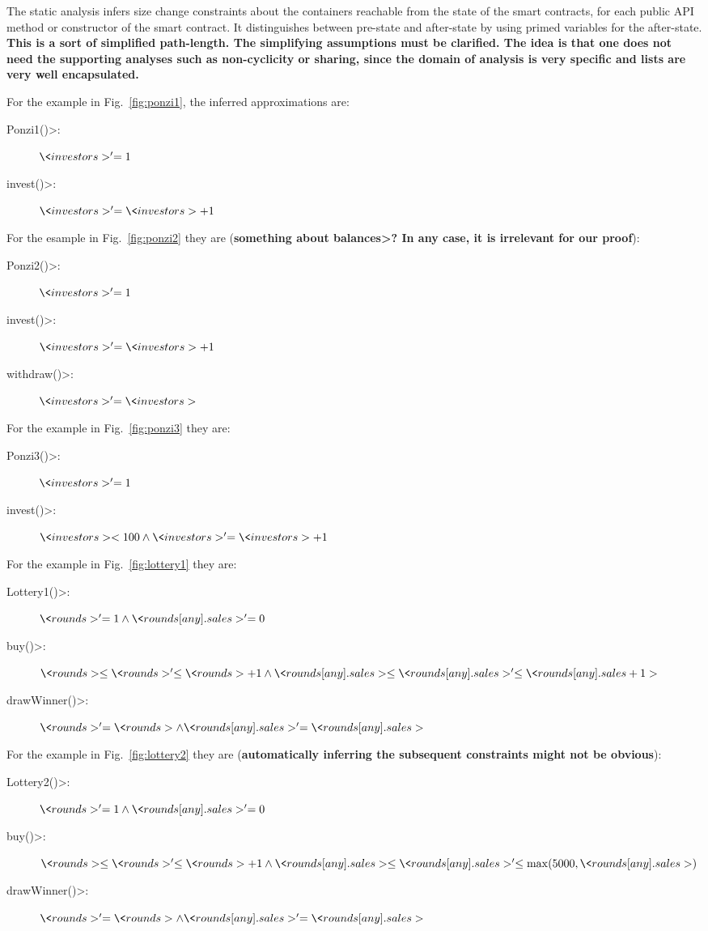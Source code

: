 The static analysis infers size change constraints about the containers
reachable from the state of the smart contracts, for each public API
method or constructor of the smart contract. It distinguishes between
pre-state and after-state by using primed variables for the after-state.
\textbf{This is a sort of simplified path-length. The simplifying
  assumptions must be clarified. The idea is that one does not need
  the supporting analyses such as non-cyclicity or sharing, since the
  domain of analysis is very specific and lists are very well encapsulated.}

For the example in Fig.~\ref{fig:ponzi1}, the inferred approximations are:
%
\begin{description}
\item[\<Ponzi1()>:] $\<investors>'=1$
\item[\<invest()>:] $\<investors>'=\<investors>+1$
\end{description}
%
For the esample in Fig.~\ref{fig:ponzi2} they are (\textbf{something about \<balances>? In any case, it is irrelevant for our proof}):
%
\begin{description}
\item[\<Ponzi2()>:] $\<investors>'=1$
\item[\<invest()>:] $\<investors>'=\<investors>+1$
\item[\<withdraw()>:] $\<investors>'=\<investors>$
\end{description}
%
For the example in Fig.~\ref{fig:ponzi3} they are:
%
\begin{description}
\item[\<Ponzi3()>:] $\<investors>'=1$
\item[\<invest()>:] $\<investors><100\wedge\<investors>'=\<investors>+1$
\end{description}
%
For the example in Fig.~\ref{fig:lottery1} they are:
%
\begin{description}
\item[\<Lottery1()>:] $\<rounds>'=1\wedge\<rounds[any].sales>'=0$
\item[\<buy()>:] $\<rounds>\le\<rounds>'\le\<rounds>+1\wedge\<rounds[any].sales>\le\<rounds[any].sales>'\le\<rounds[any].sales+1>$
\item[\<drawWinner()>:] $\<rounds>'=\<rounds>\wedge\<rounds[any].sales>'=\<rounds[any].sales>$
\end{description}
%
For the example in Fig.~\ref{fig:lottery2} they are (\textbf{automatically inferring the subsequent constraints might not be obvious}):
%
\begin{description}
\item[\<Lottery2()>:] $\<rounds>'=1\wedge\<rounds[any].sales>'=0$
\item[\<buy()>:] $\<rounds>\le\<rounds>'\le\<rounds>+1\wedge\<rounds[any].sales>\le\<rounds[any].sales>'\le\max(5000,\<rounds[any].sales>)$
\item[\<drawWinner()>:] $\<rounds>'=\<rounds>\wedge\<rounds[any].sales>'=\<rounds[any].sales>$
\end{description}


